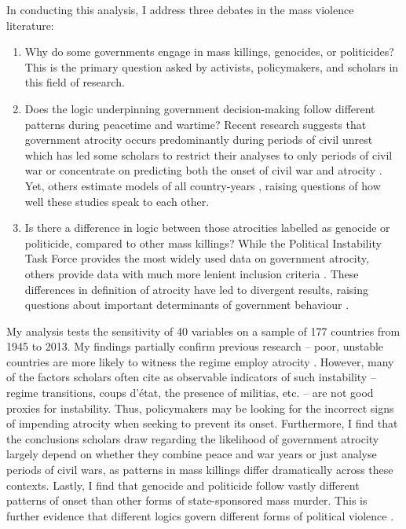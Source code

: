 In conducting this analysis, I address three debates in the mass violence literature:
	
\begin{enumerate}
 \item Why do some governments engage in mass killings, genocides, or politicides? This is the primary question asked by activists, policymakers, and scholars in this field of research. 
 \item Does the logic underpinning government decision-making follow different patterns during peacetime and wartime? Recent research suggests that government atrocity occurs predominantly during periods of civil unrest \citep{harff2003no} which has led some scholars to restrict their analyses to only periods of civil war \citep[e.g.,][]{colaresi2008kill, valentino2004draining} or concentrate on predicting both the onset of civil war and atrocity \citep{goldsmith2013forecasting}. Yet, others estimate models of all country-years \citep[e.g.,][]{krain1997state, montalvo2008discrete}, raising questions of how well these studies speak to each other.
 \item Is there a difference in logic between those atrocities labelled as genocide or politicide, compared to other mass killings? While the Political Instability Task Force \citep{marshall2017pitf} provides the most widely used data on government atrocity, others provide data with much more lenient inclusion criteria \citep[e.g.,][]{stanton2015regulating, ulfelder2012forecasting}. These differences in definition of atrocity have led to divergent results, raising questions about important determinants of government behaviour \citep[for discussion, see][]{straus2007second, uzonyi2016domestic, wayman2010explaining}.
\end{enumerate}

My analysis tests the sensitivity of 40 variables on a sample of 177 countries from 1945 to 2013. My findings partially confirm previous research -- poor, unstable countries are more likely to witness the regime employ atrocity \citep[e.g.,][]{goldsmith2013forecasting,harff2003no,krain1997state}. However, many of the factors scholars often cite as observable indicators of such instability -- regime transitions, coups d'état, the presence of militias, etc. -- are not good proxies for instability. Thus, policymakers may be looking for the incorrect signs of impending atrocity when seeking to prevent its onset. Furthermore, I find that the conclusions scholars draw regarding the likelihood of government atrocity largely depend on whether they combine peace and war years or just analyse periods of civil wars, as patterns in mass killings differ dramatically across these contexts. Lastly, I find that genocide and politicide follow vastly different patterns of onset than other forms of state-sponsored mass murder. This is further evidence that different logics govern different forms of political violence \citep{stanton2013terrorism}.

